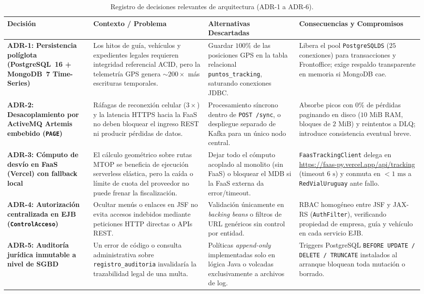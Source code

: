 \documentclass[11pt,a4paper,twocolumn]{article}
\begin{document}
\begin{table}[t]
\centering
\caption{Registro de decisiones relevantes de arquitectura (ADR-1 a ADR-6).}
\label{tab:adrs}
\scriptsize
\begin{tabularx}{\textwidth}{>{\bfseries}p{2.7cm} X X X}
\toprule
Decisión & Contexto / Problema & Alternativas Descartadas & Consecuencias y Compromisos \\
\midrule
\textbf{ADR-1:} Persistencia políglota (PostgreSQL~16 + MongoDB~7 Time-Series) & Los hitos de guía, vehículos y expedientes legales requieren integridad referencial ACID, pero la telemetría GPS genera $\sim 200\times$ más escrituras temporales. & Guardar $100\%$ de las posiciones GPS en la tabla relacional \texttt{puntos\_tracking}, saturando conexiones JDBC. & Libera el pool \texttt{PostgreSQLDS} ($25$ conexiones) para transacciones y Frontoffice; exige respaldo transparente en memoria si MongoDB cae. \\
\midrule
\textbf{ADR-2:} Desacoplamiento por ActiveMQ Artemis embebido (\texttt{PAGE}) & Ráfagas de reconexión celular ($3\times$) y la latencia HTTPS hacia la FaaS no deben bloquear el ingreso REST ni producir pérdidas de datos. & Procesamiento síncrono dentro de \texttt{POST /sync}, o despliegue separado de Kafka para un único nodo central. & Absorbe picos con $0\%$ de pérdidas paginando en disco ($10\text{ MiB}$ RAM, bloques de $2\text{ MiB}$) y reintentos a DLQ; introduce consistencia eventual breve. \\
\midrule
\textbf{ADR-3:} Cómputo de desvío en FaaS (Vercel) con fallback local & El cálculo geométrico sobre rutas MTOP se beneficia de ejecución serverless elástica, pero la caída o límite de cuota del proveedor no puede frenar la fiscalización. & Dejar todo el cómputo acoplado al monolito (sin FaaS) o bloquear el MDB si la FaaS externa da error/timeout. & \texttt{FaasTrackingClient} delega en \url{https://faas-py.vercel.app/api/tracking} (timeout $6\text{ s}$) y conmuta en $<1\text{ ms}$ a \texttt{RedVialUruguay} ante fallo. \\
\midrule
\textbf{ADR-4:} Autorización centralizada en EJB (\texttt{ControlAcceso}) & Ocultar menús o enlaces en JSF no evita accesos indebidos mediante peticiones HTTP directas o APIs REST. & Validación únicamente en \textit{backing beans} o filtros de URL genéricos sin control por entidad. & RBAC homogéneo entre JSF y JAX-RS (\texttt{AuthFilter}), verificando propiedad de empresa, guía y vehículo en cada servicio EJB. \\
\midrule
\textbf{ADR-5:} Auditoría jurídica inmutable a nivel de SGBD & Un error de código o consulta administrativa sobre \texttt{registro\_auditoria} invalidaría la trazabilidad legal de una multa. & Políticas \textit{append-only} implementadas solo en lógica Java o volcadas exclusivamente a archivos de log. & Triggers PostgreSQL \texttt{BEFORE UPDATE / DELETE / TRUNCATE} instalados al arranque bloquean toda mutación o borrado. \\

\end{tabularx}
\end{table}
\end{document}

